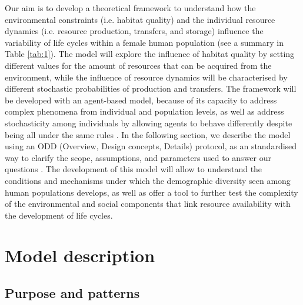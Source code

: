 \documentclass{article}
\begin{document}
Our aim is to develop a theoretical framework to understand how the environmental constraints (i.e. habitat quality) and the individual resource dynamics (i.e. resource production, transfers, and storage) influence the variability of life cycles within a female human population (see a summary in Table \ref{tab:1}). The model will explore the influence of habitat quality by setting different values for the amount of resources that can be acquired from the environment, while the influence of resource dynamics will be characterised by different stochastic probabilities of production and transfers. The framework will be developed with an agent-based model, because of its capacity to address complex phenomena from individual and population levels, as well as address stochasticity among individuals by allowing agents to behave differently despite being all under the same rules \citep{judson1994rise,wilensky2015introduction}. In the following section, we describe the model using an ODD (Overview, Design concepts, Details) protocol, as an standardised way to clarify the scope, assumptions, and parameters used to answer our questions \citep{grimm2006standard,grimm2020odd}. The development of this model will allow to understand the conditions and mechanisms under which the demographic diversity seen among human populations develops, as well as offer a tool to further test the complexity of the environmental and social components that link resource availability with the development of life cycles.

\section{Model description}

\subsection{Purpose and patterns}
\end{document}
